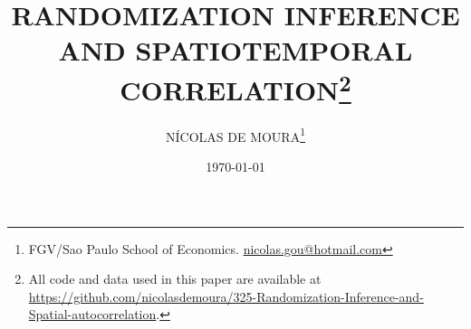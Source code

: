 \documentclass[letterpaper, 11pt]{article}
\begin{document}

\title{\normalsize\MakeUppercase{\bfseries 
Randomization Inference and Spatiotemporal Correlation}\footnote{All code and data used in this paper are available at \url{https://github.com/nicolasdemoura/325-Randomization-Inference-and-Spatial-autocorrelation}.}}
\date{\footnotesize\MakeUppercase\today}
\author{\small\MakeUppercase{Nícolas de Moura}\footnote{FGV/Sao Paulo School of Economics. \href{mailto:nicolas.gou@hotmail.com}{nicolas.gou@hotmail.com}} }
\maketitle

\vspace{-1cm}









\newpage




\newpage



\end{document}
